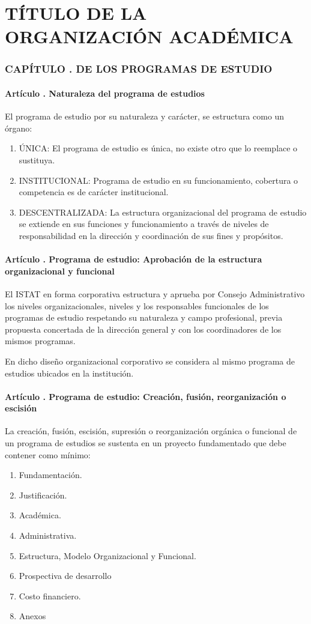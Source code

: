 \part{TÍTULO DE LA ORGANIZACIÓN ACADÉMICA}
\section{CAPÍTULO . DE LOS PROGRAMAS DE ESTUDIO}
\addtocounter{re}{1}
\subsection{Artículo . Naturaleza del programa de estudios}
\addtocounter{ns}{1}
El programa de estudio por su naturaleza y carácter, se estructura como un órgano: 
\begin{enumerate}
\item ÚNICA: El programa de estudio es única, no existe otro que lo reemplace o sustituya. 
\item INSTITUCIONAL: Programa de estudio en su funcionamiento, cobertura o competencia es de carácter institucional. 
\item DESCENTRALIZADA: La estructura organizacional del programa de estudio se extiende en sus funciones y funcionamiento a través de niveles de responsabilidad en la dirección y coordinación de sus fines y propósitos. 
\end{enumerate}
\subsection{Artículo . Programa de estudio: Aprobación de la estructura organizacional y funcional}
\addtocounter{ns}{1}
El ISTAT en forma corporativa estructura y aprueba por Consejo Administrativo los niveles organizacionales, niveles y los responsables funcionales de los programas de estudio respetando su naturaleza y campo profesional, previa propuesta concertada de la dirección general y con los coordinadores de los mismos programas. 

En dicho diseño organizacional corporativo se considera al mismo programa de estudios ubicados en la institución. 
\subsection{Artículo . Programa de estudio: Creación, fusión, reorganización o escisión}
\addtocounter{ns}{1}
La creación, fusión, escisión, supresión o reorganización orgánica o funcional de un programa de estudios se sustenta en un proyecto fundamentado que debe contener como mínimo: 
\begin{enumerate}
\item Fundamentación. 
\item Justificación. 
\item Académica. 
\item Administrativa. 
\item Estructura, Modelo Organizacional y Funcional. 
\item Prospectiva de desarrollo 
\item Costo financiero. 
\item Anexos 
\end{enumerate}
